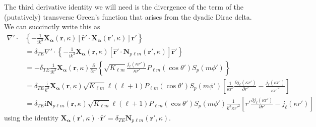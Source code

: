 The third derivative identity we will need is the divergence of the term of the (putatively) transverse Green's function that arises from the dyadic Dirac delta. We can succinctly write this as
\begin{equation}
\begin{split}
\nabla'\cdot&\left\{-\frac{1}{\mathrm{i}k^3}\mathbf{X}_{\bm{\alpha}}(\mathbf{r},\kappa)\left[\hat{\mathbf{r}}'\cdot\mathbf{X}_{\bm{\alpha}}(\mathbf{r}',\kappa)\right]\hat{\mathbf{r}}'\right\}\\
&= \delta_{TE}\nabla'\cdot\left\{-\frac{1}{\mathrm{i}k^3}\mathbf{X}_{\bm{\alpha}}(\mathbf{r},\kappa)\left[\hat{\mathbf{r}}'\cdot\mathbf{N}_{p\ell m}(\mathbf{r}',\kappa)\right]\hat{\mathbf{r}}'\right\}\\
&= -\delta_{TE}\frac{1}{\mathrm{i}k^3}\mathbf{X}_{\bm{\alpha}}(\mathbf{r},\kappa)\frac{\partial}{\partial r'}\left\{\sqrt{K_{\ell m}}\frac{j_\ell(\kappa r')}{\kappa r'}P_{\ell m}(\cos\theta')S_p(m\phi')\right\}\\
&= \delta_{TE}\frac{\mathrm{i}}{k^3}\mathbf{X}_{\bm{\alpha}}(\mathbf{r},\kappa)\sqrt{K_{\ell m}}\ell(\ell + 1)P_{\ell m}(\cos\theta')S_p(m\phi')\left[\frac{1}{\kappa r'}\frac{\partial j_\ell(\kappa r')}{\partial r'} - \frac{j_\ell(\kappa r')}{\kappa r'^2}\right]\\
&= \delta_{TE}\mathrm{i}\mathbf{N}_{p\ell m}(\mathbf{r},\kappa)\sqrt{K_{\ell m}}\ell(\ell + 1)P_{\ell m}(\cos\theta')S_p(m\phi')\frac{1}{k^3\kappa r'^2}\left[r'\frac{\partial j_\ell(\kappa r')}{\partial r'} - j_\ell(\kappa r')\right]
\end{split}
\end{equation}
using the identity $\mathbf{X}_{\bm{\alpha}}(\mathbf{r}',\kappa)\cdot\hat{\mathbf{r}}' = \delta_{TE}\mathbf{N}_{p\ell m}(\mathbf{r}',\kappa)$. 

